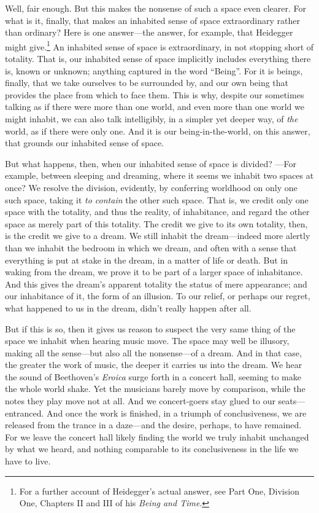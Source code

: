 \documentclass[12pt]{memoir}
\begin{document}
Well, fair enough. But this makes the nonsense
of such a space even clearer. For what is it,
finally, that makes an inhabited sense of space
extraordinary rather than ordinary? Here is one
answer---the answer, for example, that Heidegger
might give.\footnote{For a further account of
Heidegger's actual answer, see Part One, Division
One, Chapters II and III of his \emph{Being
and Time}.} An inhabited sense of space is
extraordinary, in not stopping short of totality.
That is, our inhabited sense of space implicitly
includes everything there is, known or unknown;
anything captured in the word ``Being''. For it
is beings, finally, that we take ourselves to be
surrounded by, and our own being that provides
the place from which to face them. This is why,
despite our sometimes talking as if there were
more than one world, and even more than one world
we might inhabit, we can also talk intelligibly,
in a simpler yet deeper way, of \emph{the}
world, as if there were only one. And it is our
being-in-the-world, on this answer, that grounds
our inhabited sense of space.

But what happens, then, when our inhabited sense
of space is divided? ---For example, between
sleeping and dreaming, where it seems we inhabit
two spaces at once? We resolve the division,
evidently, by conferring worldhood on only one
such space, taking it \emph{to contain} the other
such space. That is, we credit only one 
space with the totality, and thus the reality, of
inhabitance, and regard the other space as merely
part of this totality. The credit we give to its
own totality, then, is the credit we give to a
dream. We still inhabit the dream---indeed more
alertly than we inhabit the bedroom in which we
dream, and often with a sense that everything is
put at stake in the dream, in a matter of life
or death. But in waking from the dream, we prove
it to be part of a larger space of inhabitance.
And this gives the dream's apparent totality the
status of mere appearance; and our inhabitance of
it, the form of an illusion. To our relief, or
perhaps our regret, what happened to us in the
dream, didn't really happen after all.

But if this is so, then it gives us reason to
suspect the very same thing of the space we
inhabit when hearing music move. The space may
well be illusory, making all the sense---but also
all the nonsense---of a dream. And in that case,
the greater the work of music, the deeper it
carries us into the dream. We hear the sound of
Beethoven's \emph{Eroica} surge forth in a concert
hall, seeming to make the whole world shake. Yet
the musicians barely move by comparison, while
the notes they play move not at all. And we
concert-goers stay glued to our seats---entranced.
And once the work is finished, in a triumph of
conclusiveness, we are released from the trance
in a daze---and the desire, perhaps, to have
remained. For we leave the concert hall likely
finding the world we truly inhabit unchanged by
what we heard, and nothing comparable to its
conclusiveness in the life we have to live.
\end{document}
